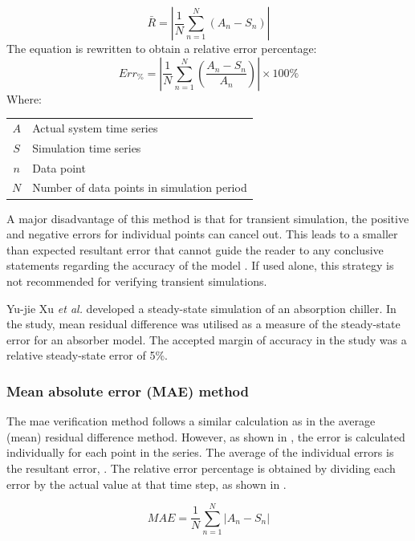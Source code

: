  			\begin{equation}
 			\label{eq: AMean absolute}
 			\bar{R} = \left| \dfrac{1}{N} \sum_{n=1}^{N}{ \left( A_{n} - S_{n}\right)} \right|
 			\end{equation}
The equation is rewritten to obtain a relative error percentage:	
 			\begin{equation}
 				\label{eq: Average difference}
 				Err_{\%} = \left| \dfrac{1}{N} \sum_{n=1}^{N}{ \left(\dfrac{ A_{n} - S_{n}}{A_n}\right)} \right| \times 100 \%
 			\end{equation}
 			Where: \par 
 				\begin{table}[!htbp]
 					\centering
 					\begin{tabular}{cl}
 						$A$ & Actual system time series \\
 						$S$ & Simulation time series \\
 						$n$ & Data point \\
 						$N$ & Number of data points in simulation period \\
 					\end{tabular} 
 				\end{table}	
 			
 			A major disadvantage of this method is that for transient simulation, the positive and negative errors for individual points can cancel out. This leads to a smaller than expected resultant error that cannot guide the reader to any conclusive statements regarding the accuracy of the model \cite{sarin2010comparing}. If used alone, this strategy is not recommended for verifying transient simulations. 
 			\par 
 						
 			Yu-jie Xu \textit{et al.} \cite{xu2016modeling} developed a steady-state simulation of an absorption chiller. In the study, mean residual difference was utilised as a measure of the steady-state error for an absorber model. The accepted margin of accuracy in the study was a relative steady-state error of 5\%. 
 			
 		\subsubsection{Mean absolute error (MAE) method}
 		The \gls{mae} verification method follows a similar calculation as in the average (mean) residual difference method. However, as shown in , the error is calculated individually for each point in the series. The average of the individual errors is the resultant error, . The relative error percentage is obtained by dividing each error by the actual value at that time step, as shown in .
 		\par
 		\begin{equation}
 		\label{eq: Relative error 2}
 		MAE = \dfrac{1}{N}\sum_{n=1}^{N}{\left|A_{n} - S_{n}\right| }
 		\end{equation}
 		
